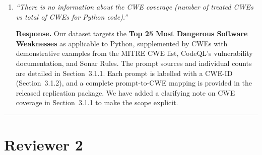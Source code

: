 \documentclass[12pt]{article}
\begin{document}
\begin{enumerate}[leftmargin=*, label=\textbf{R1.\arabic*.}]
\textbf{Response.}
The simplicity of the metrics is a deliberate design choice analogous to the
widely adopted pass@k metric. Nevertheless, we have considerably expanded the
metric evaluation in the revised paper by: (i)~reporting vulnerable@k and
security@k for $k \in \{1, 3, 5\}$ instead of only $k=1$; (ii)~computing both
metrics under two complementary assessment techniques (CodeQL static analysis and
unit-test-based dynamic analysis) for both Python and Java, yielding four distinct
metric perspectives (Sections~4.3.1--4.3.2); and (iii)~analyzing the interaction
between temperature, $k$, and security outcomes in detail in Sections~4.3 and
5.1. These results reveal non-trivial trends: for instance, security@k collapses
sharply as $k$ and temperature grow, and a model's apparent ``safety'' may be an
artifact of low compilability rather than robust security behavior.

\item \textit{``There is no information about the CWE coverage (number of treated CWEs
vs total of CWEs for Python code).''}

\textbf{Response.}
Our dataset targets the \textbf{Top 25 Most Dangerous Software Weaknesses} as
applicable to Python, supplemented by CWEs with demonstrative examples from the
MITRE CWE list, CodeQL's vulnerability documentation, and Sonar Rules. The prompt
sources and individual counts are detailed in Section~3.1.1. Each prompt is labelled
with a CWE-ID (Section~3.1.2), and a complete prompt-to-CWE mapping is provided in
the released replication package. We have added a clarifying note on CWE coverage
in Section~3.1.1 to make the scope explicit.

\end{enumerate}

\bigskip\hrule\bigskip

\section*{Reviewer 2}
\end{document}
